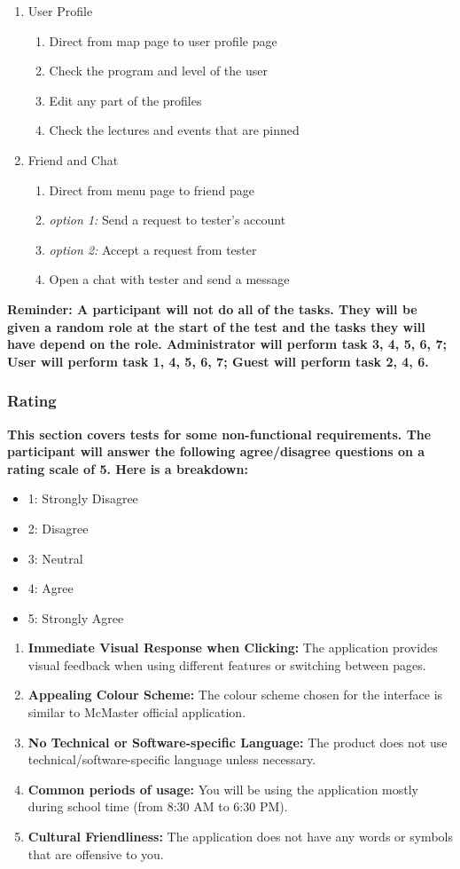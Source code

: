 \documentclass[12pt, titlepage]{article}
\begin{document}
\begin{enumerate}
\begin{enumerate}
\end{enumerate}
\item User Profile
\begin{enumerate}
\item Direct from map page to user profile page
\item Check the program and level of the user
\item Edit any part of the profiles
\item Check the lectures and events that are pinned
\end{enumerate}
\item Friend and Chat
\begin{enumerate}
\item Direct from menu page to friend page
\item \textit{option 1:} Send a request to tester's account
\item \textit{option 2:} Accept a request from tester
\item Open a chat with tester and send a message
\end{enumerate}
\end{enumerate}
\textbf{Reminder: A participant will not do all of the tasks. They will be given a random role at the start of the test and the tasks they will have depend on the role. Administrator will perform task 3, 4, 5, 6, 7; User will perform task 1, 4, 5, 6, 7; Guest will perform task 2, 4, 6.}
\subsubsection{Rating}
\textbf{This section covers tests for some non-functional requirements. The participant will answer the following agree/disagree questions on a rating scale of 5. Here is a breakdown:}
\begin{itemize}
\item 1: Strongly Disagree
\item 2: Disagree
\item 3: Neutral
\item 4: Agree
\item 5: Strongly Agree
\end{itemize}
\begin{enumerate}
	\item \textbf{Immediate Visual Response when Clicking:}  The application provides visual feedback when using different features or switching between pages.
	\item \textbf{Appealing Colour Scheme:} The colour scheme chosen for the interface is similar to McMaster official application.
	\item \textbf{No Technical or Software-specific Language:} The product does not use technical/software-specific language unless necessary.
	\item \textbf{Common periods of usage:} You will be using the application mostly during school time (from 8:30 AM to 6:30 PM).
	\item \textbf{Cultural Friendliness:} The application does not have any words or symbols that are offensive to you.
\end{enumerate}
\end{document}
